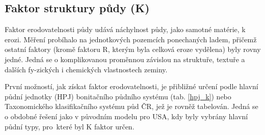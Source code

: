 \subsection{Faktor struktury půdy (K)}
Faktor erodovatelnosti půdy udává náchylnost půdy, jako samotné
matérie, k erozi. Měření probíhalo na jednotkových pozemcích
ponechaných ladem, přičemž ostatní faktory (kromě faktoru R, kterým
byla celková eroze vydělena) byly rovny jedné. Jedná se o
komplikovanou proměnnou závislou na struktuře, textuře a dalších
fy-zických i chemických vlastnostech zeminy.\cite{usle1978}

První možností, jak získat faktor erodovatelnosti, je přibližné určení
podle hlavní půdní jednotky (HPJ) bonitačního půdního systému
(tab. \ref{hpj_k}) nebo Taxonomického klasifikačního systému půd
ČR\cite{Nemecek2001}, jež je rovněž tabelován\cite{janecek2012}. Jedná
se o obdobné řešení jako v původním modelu pro USA, kdy byly vybrány
hlavní půdní typy, pro~které byl K faktor určen.\cite{usle1978}

